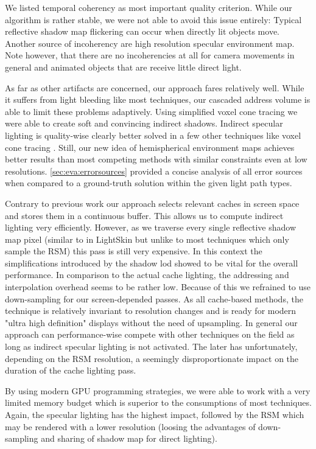 \documentclass[thesis.tex]{subfiles}
\begin{document}
We listed temporal coherency as most important quality criterion.
While our algorithm is rather stable, we were not able to avoid this issue entirely:
Typical reflective shadow map flickering can occur when directly lit objects move.
Another source of incoherency are high resolution specular environment map.
Note however, that there are no incoherencies at all for camera movements in general and animated objects that are receive little direct light.

As far as other artifacts are concerned, our approach fares relatively well.
While it suffers from light bleeding like most techniques, our cascaded address volume is able to limit these problems adaptively.
Using simplified voxel cone tracing we were able to create soft and convincing indirect shadows.
Indirect specular lighting is quality-wise clearly better solved in a few other techniques like voxel cone tracing \cite{bib:voxelconetracing}.
Still, our new idea of hemispherical environment maps achieves better results than most competing methods with similar constraints even at low resolutions.
\autoref{sec:eva:errorsources} provided a concise analysis of all error sources when compared to a ground-truth solution within the given light path types.

Contrary to previous work our approach selects relevant caches in screen space and stores them in a continuous buffer.
This allows us to compute indirect lighting very efficiently.
However, as we traverse every single reflective shadow map pixel (similar to in LightSkin \cite{bib:LightskinPaper} but unlike to most techniques which only sample the RSM) this pass is still very expensive.
In this context the simplifications introduced by the shadow lod showed to be vital for the overall performance.
In comparison to the actual cache lighting, the addressing and interpolation overhead seems to be rather low.
Because of this we refrained to use down-sampling for our screen-depended passes.
As all cache-based methods, the technique is relatively invariant to resolution changes and is ready for modern "ultra  high definition" displays without the need of upsampling.
In general our approach can performance-wise compete with other techniques on the field as long as indirect specular lighting is not activated.
The later has unfortunately, depending on the RSM resolution, a seemingly disproportionate impact on the duration of the cache lighting pass.

By using modern GPU programming strategies, we were able to work with a very limited memory budget which is superior to the consumptions of most techniques.
Again, the specular lighting has the highest impact, followed by the RSM which may be rendered with a lower resolution (loosing the advantages of down-sampling and sharing of shadow map for direct lighting).
\end{document}

